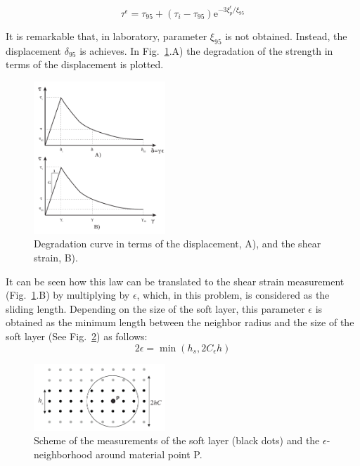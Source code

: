 \documentclass[applsci,journal,article,submit,moreauthors,pdftex]{Definitions/mdpi}
\begin{document}
\begin{equation} \label{eq19}
\tau^{\epsilon}=\tau_{95}+\left(\tau_{i}-\tau_{95}\right) \mathrm{e}^{-3 \xi^{\epsilon}_{p} / \xi_{95}}
\end{equation}

It is remarkable that, in laboratory, parameter $\xi_{95}$ is not obtained. Instead, the displacement $\delta_{95}$ is achieves. In Fig.~\ref{fig_deg}.A) the degradation of the strength in terms of the displacement is plotted.
\begin{figure}
\centering
\includegraphics[width=0.44\textwidth]{Figs/degradation.pdf}
\caption{Degradation curve in terms of the displacement, A), and the shear strain, B).}
\label{fig_deg}
\end{figure}
 It can be seen how this law can be translated to the shear strain measurement (Fig.~\ref{fig_deg}.B) by multiplying by $\epsilon$, which, in this problem, is considered as the sliding length. Depending on the size of the soft layer, this parameter $\epsilon$ is obtained as the minimum length between the neighbor radius and the size of the soft layer (See Fig.~\ref{fig_layer}) as follows:
 \begin{equation} \label{eq20}
2\epsilon = \min(h_s,2C_\epsilon h)
\end{equation}
\begin{figure}
\centering
\includegraphics[width=0.44\textwidth]{Figs/soft_layer.pdf}
\caption{Scheme of the measurements of the soft layer (black dots) and the $\epsilon$-neighborhood around material point P.}
\label{fig_layer}
\end{figure}
\end{document}

